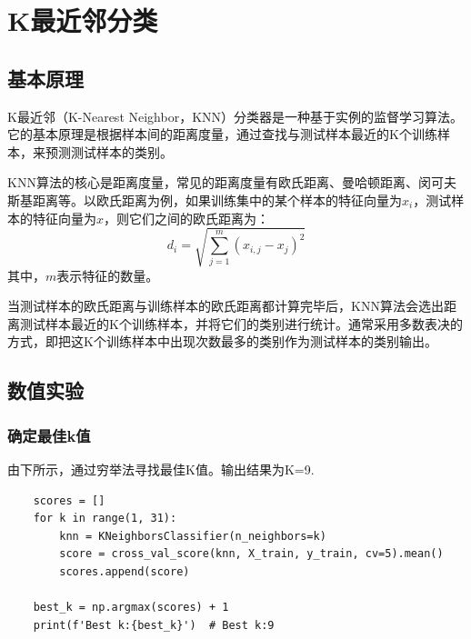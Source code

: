 \documentclass[a4paper,12pt,onecolumn,oneside]{article}
\begin{document}
\clearpage
\section{K最近邻分类}
\subsection{基本原理}
K最近邻（K-Nearest Neighbor，KNN）分类器是一种基于实例的监督学习算法。它的基本原理是根据样本间的距离度量，通过查找与测试样本最近的K个训练样本，来预测测试样本的类别。\par 
KNN算法的核心是距离度量，常见的距离度量有欧氏距离、曼哈顿距离、闵可夫斯基距离等。以欧氏距离为例，如果训练集中的某个样本的特征向量为$x_i$，测试样本的特征向量为$x$，则它们之间的欧氏距离为： 
\begin{equation*}
	d_{i}=\sqrt{\sum_{j=1}^{m}\left(x_{i, j}-x_{j}\right)^{2}}
\end{equation*}
其中，$m$表示特征的数量。\par 
当测试样本的欧氏距离与训练样本的欧氏距离都计算完毕后，KNN算法会选出距离测试样本最近的K个训练样本，并将它们的类别进行统计。通常采用多数表决的方式，即把这K个训练样本中出现次数最多的类别作为测试样本的类别输出。
\subsection{数值实验}
\subsubsection{确定最佳k值}
由下所示，通过穷举法寻找最佳K值。输出结果为K=9.
\lstset{language=Python}
\lstset{frame=lines}
\lstset{basicstyle=\footnotesize}
\begin{lstlisting}
	scores = []
	for k in range(1, 31):
		knn = KNeighborsClassifier(n_neighbors=k)
		score = cross_val_score(knn, X_train, y_train, cv=5).mean()
		scores.append(score)
	
	best_k = np.argmax(scores) + 1
	print(f'Best k:{best_k}')  # Best k:9
\end{lstlisting}
\end{document}
